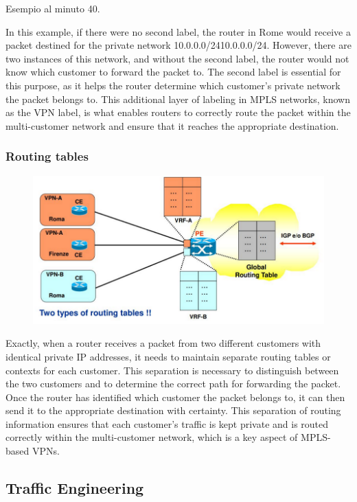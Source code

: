\documentclass[12pt]{article}
\begin{document}
Esempio al minuto 40. 

In this example, if there were no second label, the router in Rome would receive a packet destined for the private network 10.0.0.0/2410.0.0.0/24. 
However, there are two instances of this network, and without the second label, the router would not know which customer to forward the packet to. 
The second label is essential for this purpose, as it helps the router determine which customer's private network the packet belongs to. This additional layer of labeling in MPLS networks, known as the VPN label, 
is what enables routers to correctly route the packet within the multi-customer network and ensure that it reaches the appropriate destination.
\newpage
\subsubsection*{Routing tables}

\begin{figure}[ht]
    \includegraphics[scale = 0.4]{Example7.png}
    \centering
\end{figure}

Exactly, when a router receives a packet from two different customers with identical private IP addresses, it needs to maintain separate routing tables or contexts for each customer. This separation is necessary to distinguish between the two customers and to determine the correct path for forwarding the packet. Once the router has identified which customer the packet belongs to, it can then send it to the appropriate destination with certainty. This separation of routing information ensures that each customer's traffic is kept private and is routed correctly within the multi-customer network, which is a key aspect of MPLS-based VPNs.

\subsection*{Traffic Engineering}
\end{document}
